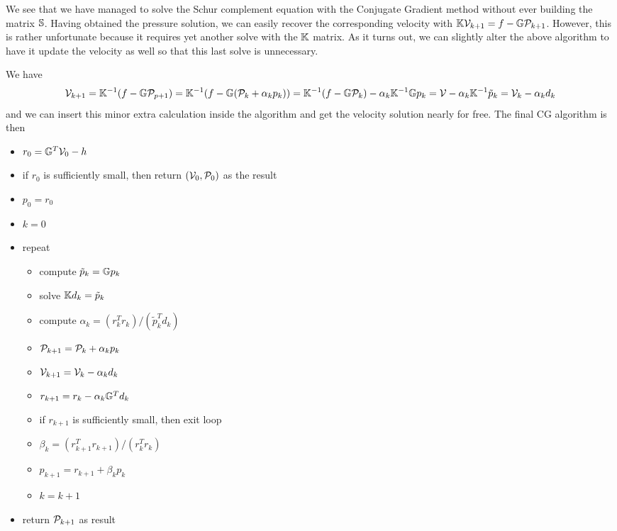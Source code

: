 We see that we have managed to solve the Schur complement equation with the Conjugate Gradient method
without ever building the matrix ${\mathbb{S}}$. Having obtained the pressure solution, we can easily recover the corresponding velocity with ${\mathbb{K}} {\cal V}_{k+1} =f- {\mathbb{G}} {\cal P}_{k+1}$. However, this is rather unfortunate because it requires yet another solve with the ${\mathbb{K}}$ matrix. As it turns out, we can slightly alter the above algorithm to have it update the velocity as well so that this last solve is unnecessary.

We have 
\[
{\cal V}_{k+1} 
= {\mathbb{K}}^{-1} (f - {\mathbb{G}} {\cal P}_{p+1} )
= {\mathbb{K}}^{-1} (f - {\mathbb{G}} ({\cal P}_k+\alpha_k p_k) )
= {\mathbb{K}}^{-1} (f - {\mathbb{G}} {\cal P}_k) - \alpha_k {\mathbb{K}}^{-1} {\mathbb{G}} p_k 
= {\cal V} - \alpha_k {\mathbb{K}}^{-1} \tilde{p}_k 
= {\cal V}_k - \alpha_k d_k 
\] 
and we can insert this minor extra calculation inside the algorithm and get the velocity solution 
nearly for free. The final CG algorithm is then 

\begin{mdframed}[backgroundcolor=blue!5]
\begin{itemize}
\item $r_0 = {\mathbb{G}}^T {\cal V}_0 - h$ 
\item if $r_0$ is sufficiently small, then return $({\cal V}_0,{\cal P}_0)$ as the result
\item $p_0=r_0$
\item $k=0$
\item repeat
\begin{itemize}
\item compute $\tilde{p}_k = {\mathbb{G}} p_k$
\item solve ${\mathbb{K}} d_k = \tilde{p}_k$
\item compute $\alpha_k=(r_k^T r_k)/(\tilde{p}_k^T d_k)$
\item ${\cal P}_{k+1} = {\cal P}_k+\alpha_k p_k$
\item $ {\cal V}_{k+1} = {\cal V}_k - \alpha_k d_k$
\item $r_{k+1} = r_k - \alpha_k {\mathbb{G}}^T d_k $
\item if $r_{k+1}$ is sufficiently small, then exit loop
\item $\beta_k=(r_{k+1}^T r_{k+1})/(r_k^T r_k)$
\item $p_{k+1} =r_{k+1}+ \beta_k p_k$
\item $k=k+1$
\end{itemize}
\item return ${\cal P}_{k+1}$ as result
\end{itemize}
\end{mdframed}

